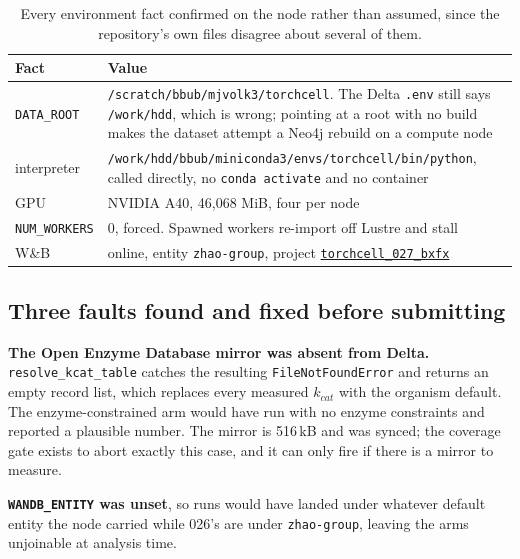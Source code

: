 \begin{table}[H]
  \centering
  \footnotesize
  \caption[Delta environment]{Every environment fact confirmed on the node rather than
  assumed, since the repository's own files disagree about several of them.}
  \label{tab:delta-env}
  \begin{tabular}{@{}p{}p{}@{}}
    \hline
    Fact & Value \\
    \hline
    \texttt{DATA\_ROOT} & \texttt{/scratch/bbub/mjvolk3/torchcell}. The Delta
      \texttt{.env} still says \texttt{/work/hdd}, which is wrong; pointing at a root with
      no build makes the dataset attempt a Neo4j rebuild on a compute node \\
    interpreter & \texttt{/work/hdd/bbub/miniconda3/envs/torchcell/bin/python}, called
      directly, no \texttt{conda activate} and no container \\
    GPU & NVIDIA A40, 46{,}068 MiB, four per node \\
    \texttt{NUM\_WORKERS} & 0, forced. Spawned workers re-import off Lustre and stall \\
    W\&B & online, entity \texttt{zhao-group}, project
      \href{https://wandb.ai/zhao-group/torchcell_027_bxfx}{\texttt{torchcell\_027\_bxfx}} \\
    \hline
  \end{tabular}
\end{table}

\subsection{Three faults found and fixed before submitting}

\textbf{The Open Enzyme Database mirror was absent from Delta.}
\texttt{resolve\_kcat\_table} catches the resulting \texttt{FileNotFoundError} and returns
an empty record list, which replaces every measured $k_{cat}$ with the organism default. The
enzyme-constrained arm would have run with no enzyme constraints and reported a plausible
number. The mirror is 516\,kB and was synced; the coverage gate exists to abort exactly this
case, and it can only fire if there is a mirror to measure.

\textbf{\texttt{WANDB\_ENTITY} was unset}, so runs would have landed under whatever default
entity the node carried while 026's are under \texttt{zhao-group}, leaving the arms
unjoinable at analysis time.

